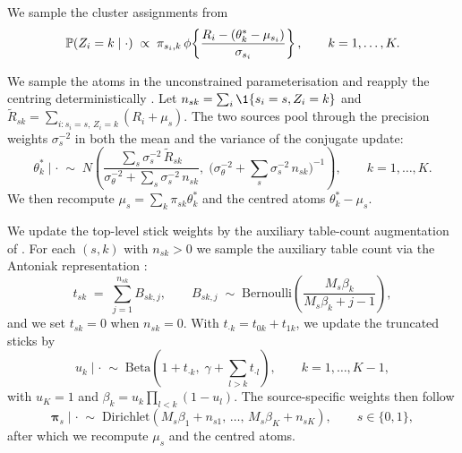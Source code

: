 We sample the cluster assignments from
\begin{equation}
\mathbb{P}(Z_i = k \mid \cdot) \;\propto\; \pi_{s_i, k}\, \phi\!\left\{\frac{R_i - (\theta_k^* - \mu_{s_i})}{\sigma_{s_i}}\right\}, \qquad k = 1, \ldots, K.
\label{eq:sm-cluster}
\end{equation}

We sample the atoms in the unconstrained parameterisation and reapply the centring deterministically \citep{yang2010semiparametric}.
Let $n_{sk} = \sum_i \1\{s_i = s, Z_i = k\}$ and $\tilde R_{sk} = \sum_{i : s_i = s,\, Z_i = k} (R_i + \mu_s)$.
The two sources pool through the precision weights $\sigma_s^{-2}$ in both the mean and the variance of the conjugate update:
\begin{equation}
\theta_k^* \mid \cdot \;\sim\; N\!\left(\frac{\sum_{s} \sigma_s^{-2}\, \tilde R_{sk}}{\sigma_\theta^{-2} + \sum_{s} \sigma_s^{-2}\, n_{sk}},\; \bigl(\sigma_\theta^{-2} + \sum_{s} \sigma_s^{-2}\, n_{sk}\bigr)^{-1}\right), \qquad k = 1, \ldots, K.
\label{eq:sm-atoms}
\end{equation}
We then recompute $\mu_s = \sum_k \pi_{sk} \theta_k^*$ and the centred atoms $\theta_k^* - \mu_s$.

We update the top-level stick weights by the auxiliary table-count augmentation of \citet{teh2006hierarchical}.
For each $(s, k)$ with $n_{sk} > 0$ we sample the auxiliary table count via the Antoniak representation \citep{antoniak1974mixtures}:
\begin{equation}
t_{sk} \;=\; \sum_{j=1}^{n_{sk}} B_{sk,j}, \qquad B_{sk,j} \;\sim\; \mathrm{Bernoulli}\!\left(\frac{M_s \beta_k}{M_s \beta_k + j - 1}\right),
\end{equation}
and we set $t_{sk} = 0$ when $n_{sk} = 0$.
With $t_{\cdot k} = t_{0k} + t_{1k}$, we update the truncated sticks by
\begin{equation}
u_k \mid \cdot \;\sim\; \mathrm{Beta}\!\left(1 + t_{\cdot k},\; \gamma + \sum_{l > k} t_{\cdot l}\right), \qquad k = 1, \ldots, K - 1,
\end{equation}
with $u_K = 1$ and $\beta_k = u_k \prod_{l < k}(1 - u_l)$.
The source-specific weights then follow
\begin{equation}
\bm{\pi}_s \mid \cdot \;\sim\; \mathrm{Dirichlet}(M_s \beta_1 + n_{s1},\, \ldots,\, M_s \beta_K + n_{sK}), \qquad s \in \{0, 1\},
\end{equation}
after which we recompute $\mu_s$ and the centred atoms.

